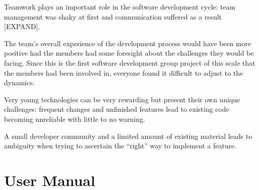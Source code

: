 \documentclass{article}
\begin{document}
    Teamwork plays an important role in the software development cycle: team management was shaky at first and communication suffered as a result [EXPAND]. \par
    
    The team's overall experience of the development process would have been more positive had the members had some foresight about the challenges they would be facing. Since this is the first software development group project of this scale that the members had been involved in, everyone found it difficult to adjust to the dynamics.\par
    
    Very young technologies can be very rewarding but present their own unique challenges: frequent changes and unfinished features lead to existing code becoming unreliable with little to no warning. \par
    
    A small developer community and a limited amount of existing material leads to ambiguity when trying to ascertain the ``right'' way to implement a feature. \par


\newpage
\appendixpage
\appendix
\section{User Manual}
\label{app:usermanual}
    
\end{document}
